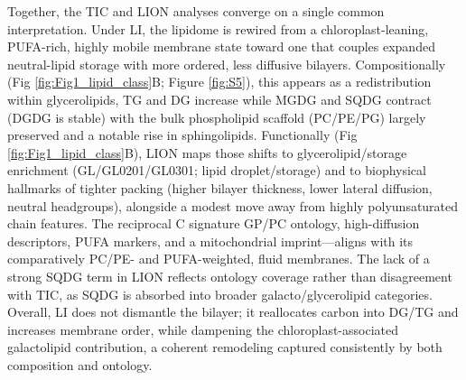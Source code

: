 \documentclass[10pt,letterpaper]{article}
\begin{document}
Together, the TIC and LION analyses converge on a single common interpretation. Under LI, the lipidome is rewired from a chloroplast-leaning, PUFA-rich, highly mobile membrane state toward one that couples expanded neutral-lipid storage with more ordered, less diffusive bilayers. Compositionally (Fig \ref{fig:Fig1_lipid_class}B; Figure \ref{fig:S5}), this appears as a redistribution within glycerolipids, TG and DG increase while MGDG and SQDG contract (DGDG is stable) with the bulk phospholipid scaffold (PC/PE/PG) largely preserved and a notable rise in sphingolipids. Functionally (Fig \ref{fig:Fig1_lipid_class}B), LION maps those shifts to glycerolipid/storage enrichment (GL/GL0201/GL0301; lipid droplet/storage) and to biophysical hallmarks of tighter packing (higher bilayer thickness, lower lateral diffusion, neutral headgroups), alongside a modest move away from highly polyunsaturated chain features. The reciprocal C signature GP/PC ontology, high-diffusion descriptors, PUFA markers, and a mitochondrial imprint—aligns with its comparatively PC/PE- and PUFA-weighted, fluid membranes. The lack of a strong SQDG term in LION reflects ontology coverage rather than disagreement with TIC, as SQDG is absorbed into broader galacto/glycerolipid categories. Overall, LI does not dismantle the bilayer; it reallocates carbon into DG/TG and increases membrane order, while dampening the chloroplast-associated galactolipid contribution, a coherent remodeling captured consistently by both composition and ontology.
\end{document}

